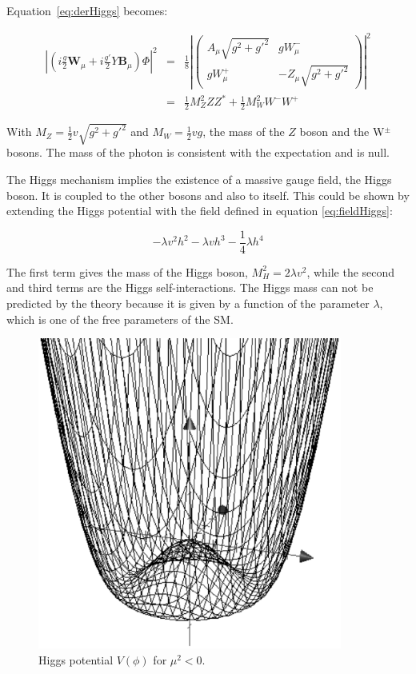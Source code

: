       Equation~\ref{eq:derHiggs} becomes:

      \begin{equation}
        \begin{array}{rcl}
       \left|\left(i\frac{g}{2}\textbf{W}_{\mu} +i\frac{g'}{2}Y\textbf{B}_{\mu}\right) \Phi \right|^2 & = & \frac{1}{8} \left| 
          \begin{pmatrix}
            A_{\mu}\sqrt{g^2 + g'^2} & gW^-_{\mu} \\
            gW^+_{\mu} & -Z_{\mu}\sqrt{g^2 + g'^2}
          \end{pmatrix}
       \right|^2 \\
        & = & \frac{1}{2}M^2_Z ZZ^* + \frac{1}{2}M^2_W W^-W^+
        \end{array}
      \end{equation}

      With $M_Z = \frac{1}{2}v\sqrt{g^2 + g'^2}$ and $M_W = \frac{1}{2} vg$, the mass of the $Z$ boson and the W$^{\pm}$ bosons. 
      The mass of the photon is consistent with the expectation and is null. 

      The Higgs mechanism implies the existence of a massive gauge field, the Higgs boson.
      It is coupled to the other bosons and also to itself.
      This could be shown by extending the Higgs potential with the field defined in equation \ref{eq:fieldHiggs}:

      \begin{equation}
        -\lambda v^2h^2 - \lambda v h^3 - \frac{1}{4}\lambda h^4
      \end{equation}

      The first term gives the mass of the Higgs boson, $M^2_H = 2\lambda v^2$, while the second and third terms are the Higgs self-interactions.
      The Higgs mass can not be predicted by the theory because it is given by a function of the parameter $\lambda$, which is one of the free parameters of the \gls{SM}.
      
      \begin{figure}[h]
      \centering
        \includegraphics[width = 10cm]{Pictures/SM/mexHat.eps}
      \caption{Higgs potential $V(\phi)$ for $\mu^2 < 0$.}
      \label{fig:scalarPotential}
      \end{figure}

